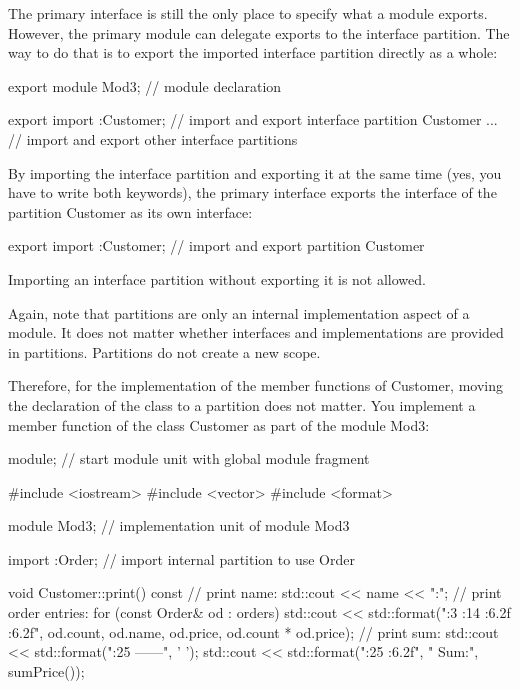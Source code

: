 The primary interface is still the only place to specify what a module exports. However, the primary module can delegate exports to the interface partition. The way to do that is to export the imported interface partition directly as a whole:


\begin{cpp}
export module Mod3; // module declaration

export import :Customer; // import and export interface partition Customer
... // import and export other interface partitions
\end{cpp}

By importing the interface partition and exporting it at the same time (yes, you have to write both keywords), the primary interface exports the interface of the partition Customer as its own interface:

\begin{cpp}
export import :Customer; // import and export partition Customer
\end{cpp}

Importing an interface partition without exporting it is not allowed.

Again, note that partitions are only an internal implementation aspect of a module. It does not matter whether interfaces and implementations are provided in partitions. Partitions do not create a new scope.

Therefore, for the implementation of the member functions of Customer, moving the declaration of the class to a partition does not matter. You implement a member function of the class Customer as part of the module Mod3:


\begin{cpp}
module; // start module unit with global module fragment

#include <iostream>
#include <vector>
#include <format>

module Mod3; // implementation unit of module Mod3

import :Order; // import internal partition to use Order

void Customer::print() const
{
	// print name:
	std::cout << name << ":\n";
	// print order entries:
	for (const Order& od : orders) {
		std::cout << std::format("{:3} {:14} {:6.2f} {:6.2f}\n",
								   od.count, od.name, od.price, od.count * od.price);
	}
	// print sum:
	std::cout << std::format("{:25} ------\n", ' ');
	std::cout << std::format("{:25} {:6.2f}\n", " Sum:", sumPrice());
}
\end{cpp}

